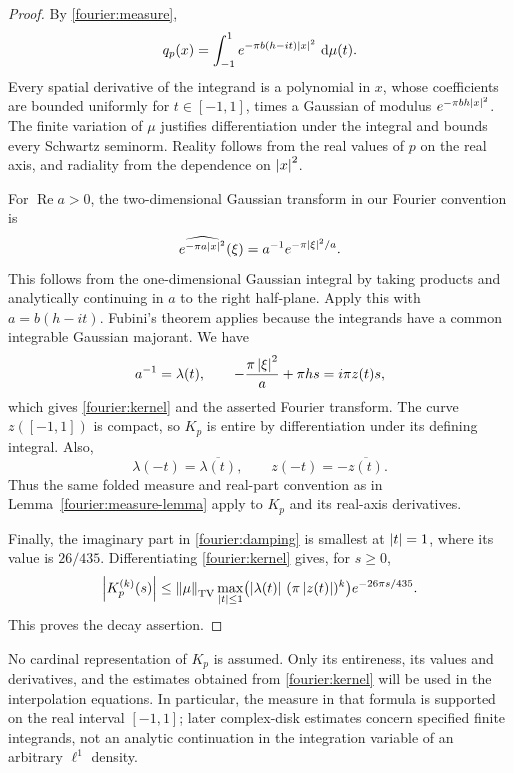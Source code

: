 \begin{proof}
By \eqref{fourier:measure},
\[
 q_p(x)=\int_{-1}^{1}e^{-\pi b(h-it)\left\lvert x\right\rvert^2}\,\mathop{}\!\mathrm d\mu(t).
\]
Every spatial derivative of the integrand is a polynomial in \(x\), whose
coefficients are bounded uniformly for \(t\in[-1,1]\), times a Gaussian of
modulus \(e^{-\pi bh\left\lvert x\right\rvert^2}\).  The finite variation of \(\mu\)
justifies differentiation under the integral and bounds every Schwartz
seminorm.  Reality follows from the real values of \(p\) on the real axis,
and radiality from the dependence on \(\left\lvert x\right\rvert^2\).

For \(\operatorname{Re}a>0\), the two-dimensional Gaussian transform in
our Fourier convention is
\[
 \widehat{e^{-\pi a\left\lvert x\right\rvert^2}}(\xi)
   =a^{-1}e^{-\pi\left\lvert\xi\right\rvert^2/a}.
\]
This follows from the one-dimensional Gaussian integral by taking products
and analytically continuing in \(a\) to the right half-plane.
Apply this with \(a=b(h-it)\).  Fubini's theorem applies because the
integrands have a common integrable Gaussian majorant.  We have
\[
 a^{-1}=\lambda(t),\qquad
 -\frac{\pi\left\lvert\xi\right\rvert^2}{a}+\pi hs=i\pi z(t)s,
\]
which gives \eqref{fourier:kernel} and the asserted Fourier transform.
The curve \(z([-1,1])\) is compact, so \(K_p\) is entire by differentiation
under its defining integral.  Also,
\[
 \lambda(-t)=\overline{\lambda(t)},\qquad
 z(-t)=-\overline{z(t)}.
\]
Thus the same folded measure and real-part convention as in
Lemma~\ref{fourier:measure-lemma} apply to \(K_p\) and its real-axis
derivatives.

Finally, the imaginary part in \eqref{fourier:damping} is smallest at
\(\left\lvert t\right\rvert=1\), where its value is \(26/435\).  Differentiating
\eqref{fourier:kernel} gives, for \(s\ge0\),
\[
 \left\lvert K_p^{(k)}(s)\right\rvert
 \le\left\lVert\mu\right\rVert_{\mathrm{TV}}
     \max_{\left\lvert t\right\rvert\le1}\bigl(\left\lvert\lambda(t)\right\rvert\,
                              (\pi\left\lvert z(t)\right\rvert)^k\bigr)
     e^{-26\pi s/435}.
\]
This proves the decay assertion.
\end{proof}

No cardinal representation of \(K_p\) is assumed.  Only its entireness, its values and
derivatives, and the estimates obtained from \eqref{fourier:kernel} will be
used in the interpolation equations.  In particular, the measure in that
formula is supported on the real interval \([-1,1]\); later complex-disk
estimates concern specified finite integrands, not an analytic continuation
in the integration variable of an arbitrary \(\ell^1\) density.


